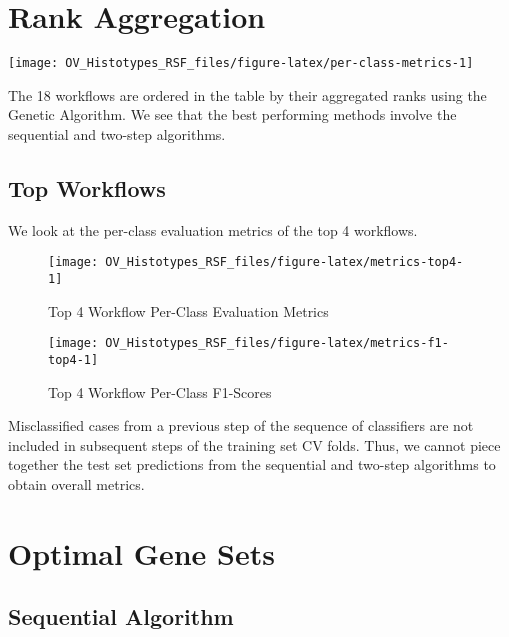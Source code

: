 \documentclass[
]{report}
\begin{document}
\section{Rank Aggregation}\label{rank-aggregation}

\begin{center}\texttt{[image: OV\_Histotypes\_RSF\_files/figure-latex/per-class-metrics-1]} \end{center}

The 18 workflows are ordered in the table by their aggregated ranks using the Genetic Algorithm. We see that the best performing methods involve the sequential and two-step algorithms.

\subsection{Top Workflows}\label{top-workflows}

We look at the per-class evaluation metrics of the top 4 workflows.

\begin{figure}[H]

{\centering \texttt{[image: OV\_Histotypes\_RSF\_files/figure-latex/metrics-top4-1]} 

}

\caption{Top 4 Workflow Per-Class Evaluation Metrics}\label{fig:metrics-top4}
\end{figure}

\begin{figure}[H]

{\centering \texttt{[image: OV\_Histotypes\_RSF\_files/figure-latex/metrics-f1-top4-1]} 

}

\caption{Top 4 Workflow Per-Class F1-Scores}\label{fig:metrics-f1-top4}
\end{figure}

Misclassified cases from a previous step of the sequence of classifiers are not included in subsequent steps of the training set CV folds. Thus, we cannot piece together the test set predictions from the sequential and two-step algorithms to obtain overall metrics.

\section{Optimal Gene Sets}\label{optimal-gene-sets}

\subsection{Sequential Algorithm}\label{sequential-algorithm-1}
\end{document}
